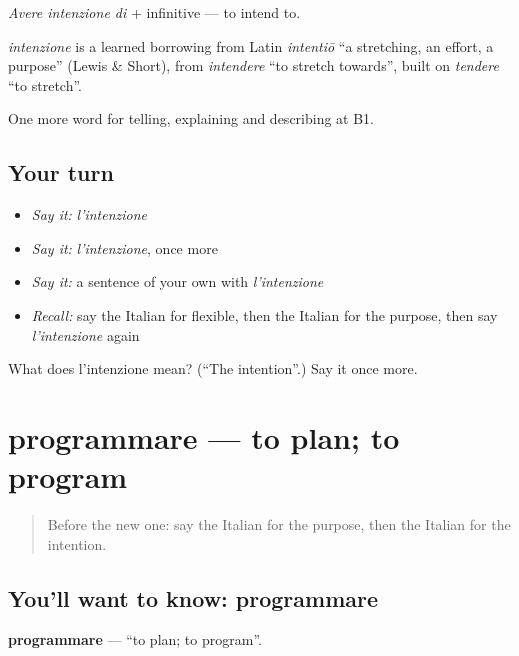 \emph{Avere intenzione di} + infinitive — to intend to.

\begin{cousinweb}
\emph{intenzione} is a learned borrowing from Latin \emph{intentiō} \textquotedblleft{}a stretching, an effort, a purpose\textquotedblright{} (Lewis \& Short), from \emph{intendere} \textquotedblleft{}to stretch towards\textquotedblright{}, built on \emph{tendere} \textquotedblleft{}to stretch\textquotedblright{}.
\end{cousinweb}

\begin{grammarlens}[title={What you've built}]
One more word for telling, explaining and describing at B1.
\end{grammarlens}

\subsection*{Your turn}
\begin{itemize}
\raggedright
  \item \emph{Say it:} \emph{l'intenzione}
  \item \emph{Say it:} \emph{l'intenzione}, once more
  \item \emph{Say it:} a sentence of your own with \emph{l'intenzione}
  \item \emph{Recall:} say the Italian for flexible, then the Italian for the purpose, then say \emph{l'intenzione} again
\end{itemize}

\begin{tcolorbox}[breakable,colback=teal!4,colframe=teal!35!black,title={Before you move on}]
What does l'intenzione mean? (\textquotedblleft{}The intention\textquotedblright{}.) Say it once more.
\end{tcolorbox}
\section[programmare]{programmare — to plan; to program}

\label{lesson:IT-C378-programmare}



\begin{quote}
Before the new one: say the Italian for the purpose, then the Italian for the intention.
\end{quote}

\subsection*{You'll want to know: programmare}
\textbf{programmare} — \textquotedblleft{}to plan; to program\textquotedblright{}.

